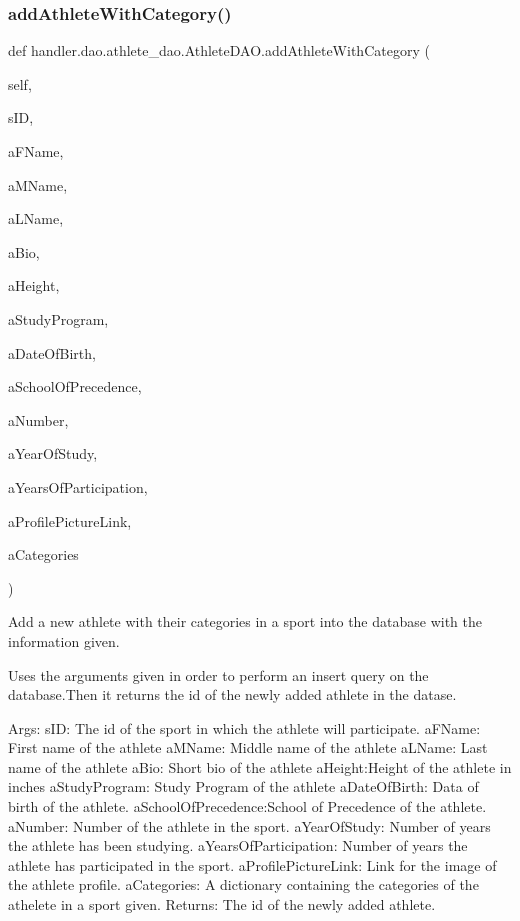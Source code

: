 \subsubsection{\texorpdfstring{add\+Athlete\+With\+Category()}{addAthleteWithCategory()}}
{\footnotesize\ttfamily def handler.\+dao.\+athlete\+\_\+dao.\+Athlete\+D\+A\+O.\+add\+Athlete\+With\+Category (\begin{DoxyParamCaption}\item[{}]{self,  }\item[{}]{s\+ID,  }\item[{}]{a\+F\+Name,  }\item[{}]{a\+M\+Name,  }\item[{}]{a\+L\+Name,  }\item[{}]{a\+Bio,  }\item[{}]{a\+Height,  }\item[{}]{a\+Study\+Program,  }\item[{}]{a\+Date\+Of\+Birth,  }\item[{}]{a\+School\+Of\+Precedence,  }\item[{}]{a\+Number,  }\item[{}]{a\+Year\+Of\+Study,  }\item[{}]{a\+Years\+Of\+Participation,  }\item[{}]{a\+Profile\+Picture\+Link,  }\item[{}]{a\+Categories }\end{DoxyParamCaption})}

\begin{DoxyVerb}Add a new athlete with their categories in a sport
into the database with the information given.

Uses the arguments given in order to perform an insert query on 
the database.Then it returns the id of the newly added athlete in
the datase.

Args:
    sID: The id of the sport in which the athlete will participate.
    aFName: First name of the athlete
    aMName: Middle name of the athlete
    aLName: Last name of the athlete
    aBio: Short bio of the athlete
    aHeight:Height of the athlete in inches
    aStudyProgram: Study Program of the athlete
    aDateOfBirth: Data of birth of the athlete.
    aSchoolOfPrecedence:School of Precedence of the athlete.
    aNumber: Number of the athlete in the sport.
    aYearOfStudy: Number of years the athlete has been studying.
    aYearsOfParticipation: Number of years the athlete has participated in the sport.
    aProfilePictureLink: Link for the image of the athlete profile.
    aCategories: A dictionary containing the categories of the athelete in 
        a sport given.
Returns:
    The id of the newly added athlete.
\end{DoxyVerb}
 \mbox{\label{classhandler_1_1dao_1_1athlete__dao_1_1_athlete_d_a_o_a1fe64fa924a8b61d35696786f259c17f}} 
